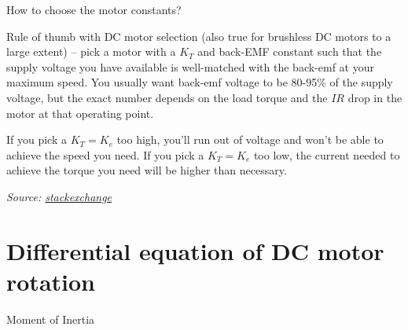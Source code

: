 \documentclass[compress]{beamer}
\newcommand{\source}[2]{{\tiny\it Source: \href{#1}{#2}}}
\begin{document}
\begin{frame}{How to choose the motor constants?}

    Rule of thumb with DC motor selection (also true for brushless DC motors to
    a large extent) -- pick a motor with a $K_T$ and back-EMF constant such that
    the supply voltage you have available is well-matched with the back-emf at
    your maximum speed. You usually want back-emf voltage to be 80-95\% of the
    supply voltage, but the exact number depends on the load torque and the $I R$
    drop in the motor at that operating point.

    If you pick a $K_T=K_e$ too high, you'll run out of voltage and won't be
    able to achieve the speed you need. If you pick a $K_T=K_e$ too low, the
    current needed to achieve the torque you need will be higher than necessary.

    \source{https://electronics.stackexchange.com/questions/33315/understanding-motor-constants-kt-and-kemf-for-comparing-brushless-dc-motors}{stackexchange}
\end{frame}


\section[Diff. equations]{Differential equation of DC motor rotation}

{
\begin{frame}{Moment of Inertia}
%
%
%
%
%
\end{frame}
}
\end{document}
